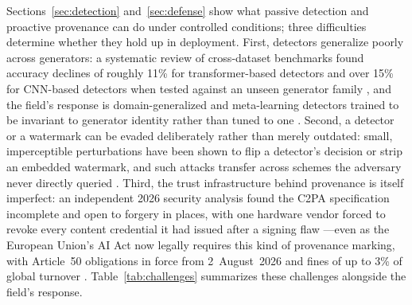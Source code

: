 \documentclass[a4paper,12pt]{article}
\begin{document}
Sections~\ref{sec:detection} and~\ref{sec:defense} show what passive detection and proactive provenance can do under controlled conditions; three difficulties determine whether they hold up in deployment. First, detectors generalize poorly across generators: a systematic review of cross-dataset benchmarks found accuracy declines of roughly 11\% for transformer-based detectors and over 15\% for CNN-based detectors when tested against an unseen generator family \cite{raza2026review}, and the field's response is domain-generalized and meta-learning detectors trained to be invariant to generator identity rather than tuned to one \cite{nguyenle2026survey}. Second, a detector or a watermark can be evaded deliberately rather than merely outdated: small, imperceptible perturbations have been shown to flip a detector's decision or strip an embedded watermark, and such attacks transfer across schemes the adversary never directly queried \cite{jiang2023evading}. Third, the trust infrastructure behind provenance is itself imperfect: an independent 2026 security analysis found the C2PA specification incomplete and open to forgery in places, with one hardware vendor forced to revoke every content credential it had issued after a signing flaw \cite{golaszewski2026c2pa}---even as the European Union's AI Act now legally requires this kind of provenance marking, with Article~50 obligations in force from 2~August~2026 and fines of up to 3\% of global turnover \cite{euaiact2024}. Table~\ref{tab:challenges} summarizes these challenges alongside the field's response.
\end{document}
